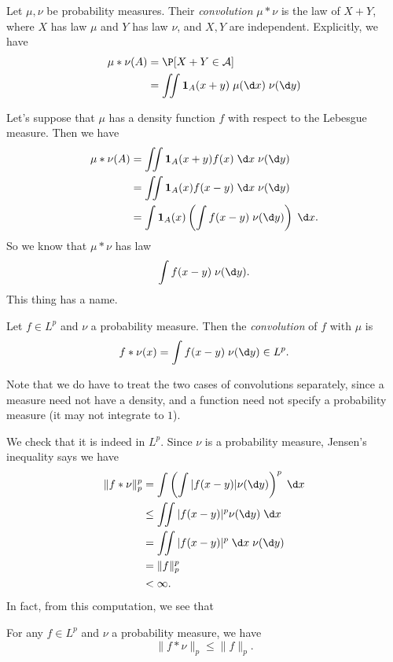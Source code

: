\documentclass[a4paper]{article}
\begin{document}
\begin{defi}
  Let $\mu, \nu$ be probability measures. Their \emph{convolution} $\mu * \nu$ is the law of $X + Y$, where $X$ has law $\mu$ and $Y$ has law $\nu$, and $X, Y$ are independent. Explicitly, we have
  \begin{align*}
    \mu * \nu (A) &= \P[X + Y \in \mathcal{A}] \\
    &= \iint \mathbf{1}_{A}(x + y)\;\mu(\d x)\;\nu(\d y)
  \end{align*}
\end{defi}
Let's suppose that $\mu$ has a density function $f$ with respect to the Lebesgue measure. Then we have
\begin{align*}
  \mu * \nu(A) &= \iint \mathbf{1}_A(x + y) f(x) \;\d x\;\nu(\d y)\\
  &= \iint \mathbf{1}_A(x) f(x - y) \;\d x\;\nu(\d y)\\
  &= \int \mathbf{1}_A(x) \left(\int f(x - y)\;\nu (\d y)\right)\;\d x.
\end{align*}
So we know that $\mu * \nu$ has law
\[
  \int f(x - y)\;\nu (\d y).
\]
This thing has a name.
\begin{defi}
  Let $f \in L^p$ and $\nu$ a probability measure. Then the \emph{convolution} of $f$ with $\mu$ is
  \[
    f * \nu(x) = \int f(x - y)\;\nu(\d y) \in L^p.
  \]
\end{defi}
Note that we do have to treat the two cases of convolutions separately, since a measure need not have a density, and a function need not specify a probability measure (it may not integrate to $1$).

We check that it is indeed in $L^p$. Since $\nu$ is a probability measure, Jensen's inequality says we have
\begin{align*}
  \|f * \nu\|_p^p &= \int \left(\int |f(x - y)| \nu(\d y)\right)^p \;\d x\\
  &\leq \iint |f(x - y)|^p \nu(\d y)\;\d x\\
  &= \iint |f(x - y)|^p \;\d x \;\nu (\d y)\\
  &= \|f\|_p^p \\
  &< \infty.
\end{align*}
In fact, from this computation, we see that
\begin{prop}
  For any $f \in L^p$ and $\nu$ a probability measure, we have
  \[
    \|f * \nu\|_p \leq \|f\|_p.
  \]
\end{prop}
\end{document}
